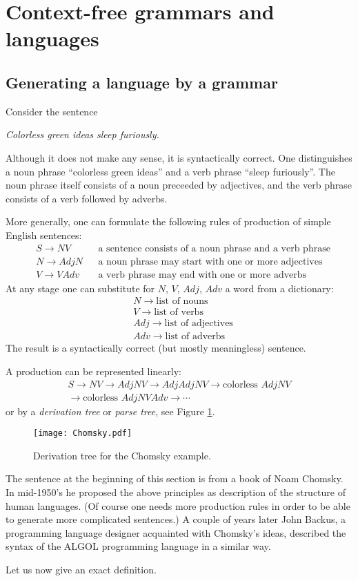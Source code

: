 \section{Context-free grammars and languages}
\subsection{Generating a language by a grammar}
\label{sec:LangGram}
Consider the sentence
\begin{center}
\emph{Colorless green ideas sleep furiously.}
\end{center}
Although it does not make any sense, it is syntactically correct.
One distinguishes a noun phrase ``colorless green ideas'' and a verb phrase ``sleep furiously''.
The noun phrase itself consists of a noun preceeded by adjectives, and the verb phrase consists of a verb followed by adverbs.

More generally, one can formulate the following rules of production of simple English sentences:
\begin{align*}
&S \to NV &&\text{a sentence consists of a noun phrase and a verb phrase}\\
&N \to AdjN &&\text{a noun phrase may start with one or more adjectives}\\
&V \to VAdv &&\text{a verb phrase may end with one or more adverbs}
\end{align*}
At any stage one can substitute for $N$, $V$, $Adj$, $Adv$ a word from a dictionary:
\begin{align*}
&N \to \text{list of nouns}\\
&V \to \text{list of verbs}\\
&Adj \to \text{list of adjectives}\\
&Adv \to \text{list of adverbs}
\end{align*}
The result is a syntactically correct (but mostly meaningless) sentence.

A production can be represented linearly:
\begin{multline*}
S \to NV \to AdjNV \to AdjAdjNV \to \text{colorless }AdjNV\\
\to \text{colorless }AdjNVAdv \to \cdots 
\end{multline*}
or by a \emph{derivation tree} or \emph{parse tree}, see Figure \ref{fig:Chomsky}.

\begin{figure}[ht]
\begin{center}
\texttt{[image: Chomsky.pdf]}
\end{center}
\caption{Derivation tree for the Chomsky example.}
\label{fig:Chomsky}
\end{figure}

The sentence at the beginning of this section is from a book of Noam Chomsky.
In mid-1950's he proposed the above principles as description of the structure of human languages.
(Of course one needs more production rules in order to be able to generate more complicated sentences.)
A couple of years later John Backus, a programming language designer acquainted with Chomsky's ideas,
described the syntax of the ALGOL programming language in a similar way.

Let us now give an exact definition.